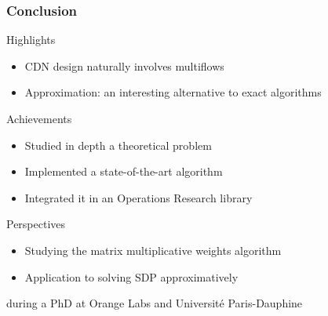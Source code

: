 \documentclass{beamer}
\begin{document}
\begin{frame}
    \frametitle{Conclusion}

    \begin{block}{Highlights}
        \begin{itemize}
            \item CDN design naturally involves multiflows
            \item Approximation: an interesting alternative to exact algorithms
        \end{itemize}
    \end{block}

    \begin{block}{Achievements}
        \begin{itemize}
            \item Studied in depth a theoretical problem
            \item Implemented a state-of-the-art algorithm
            \item Integrated it in an Operations Research library
        \end{itemize}
    \end{block}

    \begin{block}{Perspectives}
        \begin{itemize}
            \item Studying the matrix multiplicative weights algorithm
            \item Application to solving SDP approximatively
        \end{itemize}
        during a PhD at Orange Labs and Universit\'e Paris-Dauphine
    \end{block}
\end{frame}
\end{document}
